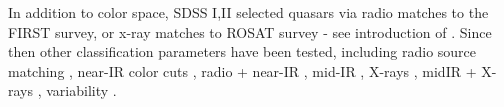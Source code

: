 \documentclass[modern]{aastex62}
\begin{document}
In addition to color space, SDSS I,II selected quasars via radio matches to the FIRST survey, or x-ray matches to ROSAT survey  - see introduction of \citep{myers2015}. Since then other classification parameters have been tested, including radio source matching \citep{mcgreer2009}, near-IR color cuts \citep{banerji2012},  radio + near-IR \citep{glikman2012}, mid-IR \citep{stern2005, richards2009a, stern2012}, X-rays \citep{trichas2012},  midIR + X-rays \citep{lacy2007, hickox2007, hickox2009}, variability \citep{schmidt2010, butler2011, macleod2011, palanque2011}. 



%
\end{document}
